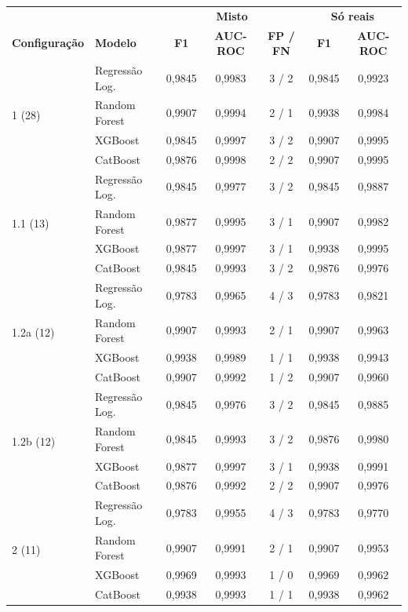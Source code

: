 \documentclass[msc]{on} %
\providecommand{\DIFaddbegin}{} %
\providecommand{\DIFaddend}{} %
\providecommand{\DIFdelend}{} %
\providecommand{\DIFdelbeginFL}{} %
\begin{document}
\begin{table}[htbp]
\DIFdelbeginFL %
\DIFdelend\ifhmode\hskip0pt\fi \DIFaddbegin \label{tab:teste_todas}
\footnotesize
\begin{tabular}{llccccc}
\hline
 & & \multicolumn{3}{c}{\textbf{Misto}} & \multicolumn{2}{c}{\textbf{Só reais}} \\
\textbf{Configuração} & \textbf{Modelo} & \textbf{F1} & \textbf{AUC-ROC} & \textbf{FP / FN} & \textbf{F1} & \textbf{AUC-ROC} \\
\hline
\multirow{4}{*}{1 (28)} & Regressão Log. & 0{,}9845 & 0{,}9983 & 3 / 2 & 0{,}9845 & 0{,}9923 \\
 & Random Forest & 0{,}9907 & 0{,}9994 & 2 / 1 & 0{,}9938 & 0{,}9984 \\
 & XGBoost & 0{,}9845 & 0{,}9997 & 3 / 2 & 0{,}9907 & 0{,}9995 \\
 & CatBoost & 0{,}9876 & 0{,}9998 & 2 / 2 & 0{,}9907 & 0{,}9995 \\
\hline
\multirow{4}{*}{1.1 (13)} & Regressão Log. & 0{,}9845 & 0{,}9977 & 3 / 2 & 0{,}9845 & 0{,}9887 \\
 & Random Forest & 0{,}9877 & 0{,}9995 & 3 / 1 & 0{,}9907 & 0{,}9982 \\
 & XGBoost & 0{,}9877 & 0{,}9997 & 3 / 1 & 0{,}9938 & 0{,}9995 \\
 & CatBoost & 0{,}9845 & 0{,}9993 & 3 / 2 & 0{,}9876 & 0{,}9976 \\
\hline
\multirow{4}{*}{1.2a (12)} & Regressão Log. & 0{,}9783 & 0{,}9965 & 4 / 3 & 0{,}9783 & 0{,}9821 \\
 & Random Forest & 0{,}9907 & 0{,}9993 & 2 / 1 & 0{,}9907 & 0{,}9963 \\
 & XGBoost & 0{,}9938 & 0{,}9989 & 1 / 1 & 0{,}9938 & 0{,}9943 \\
 & CatBoost & 0{,}9907 & 0{,}9992 & 1 / 2 & 0{,}9907 & 0{,}9960 \\
\hline
\multirow{4}{*}{1.2b (12)} & Regressão Log. & 0{,}9845 & 0{,}9976 & 3 / 2 & 0{,}9845 & 0{,}9885 \\
 & Random Forest & 0{,}9845 & 0{,}9993 & 3 / 2 & 0{,}9876 & 0{,}9980 \\
 & XGBoost & 0{,}9877 & 0{,}9997 & 3 / 1 & 0{,}9938 & 0{,}9991 \\
 & CatBoost & 0{,}9876 & 0{,}9992 & 2 / 2 & 0{,}9907 & 0{,}9976 \\
\hline
\multirow{4}{*}{2 (11)} & Regressão Log. & 0{,}9783 & 0{,}9955 & 4 / 3 & 0{,}9783 & 0{,}9770 \\
 & Random Forest & 0{,}9907 & 0{,}9991 & 2 / 1 & 0{,}9907 & 0{,}9953 \\
 & XGBoost & 0{,}9969 & 0{,}9993 & 1 / 0 & 0{,}9969 & 0{,}9962 \\
 & CatBoost & 0{,}9938 & 0{,}9993 & 1 / 1 & 0{,}9938 & 0{,}9962 \\
\hline
\end{tabular}
\end{table}
\DIFaddend 
\end{document}
